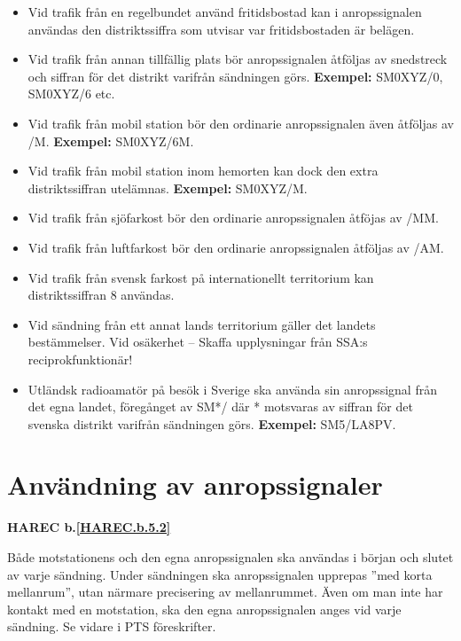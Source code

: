 \begin{itemize}

\item Vid trafik från en regelbundet använd fritidsbostad kan i
  anropssignalen användas den distriktssiffra som utvisar var
  fritidsbostaden är belägen.

\item Vid trafik från annan tillfällig plats bör anropssignalen
  åtföljas av snedstreck och siffran för det distrikt varifrån
  sändningen görs. \textbf{Exempel:} SM0XYZ/0, SM0XYZ/6 etc.

\item Vid trafik från mobil station bör den ordinarie anropssignalen
  även åtföljas av /M.  \textbf{Exempel:} SM0XYZ/6M.

\item Vid trafik från mobil station inom hemorten kan dock den extra
  distriktssiffran utelämnas.  \textbf{Exempel:} SM0XYZ/M.

\item Vid trafik från sjöfarkost bör den ordinarie anropssignalen
 åtföjas av /MM.

\item Vid trafik från luftfarkost bör den ordinarie anropssignalen
  åtföljas av /AM.

\item Vid trafik från svensk farkost på internationellt territorium
 kan distriktssiffran 8 användas.

\item Vid sändning från ett annat lands territorium gäller det landets
  bestämmelser. Vid osäkerhet -- Skaffa upplysningar från SSA:s
  reciprokfunktionär!

\item Utländsk radioamatör på besök i Sverige ska använda sin
  anropssignal från det egna landet, föregånget av SM*/ där *
  motsvaras av siffran för det svenska distrikt varifrån sändningen
  görs. \textbf{Exempel:} SM5/LA8PV.
\end{itemize}

\section{Användning av anropssignaler}
\textbf{
HAREC b.\ref{HAREC.b.5.2}\label{myHAREC.b.5.2}
}

Både motstationens och den egna anropssignalen ska användas i början
och slutet av varje sändning. Under sändningen ska anropssignalen
upprepas ''med korta mellanrum'', utan närmare precisering av
mellanrummet. Även om man inte har kontakt med en motstation, ska
den egna anropssignalen anges vid varje sändning. Se vidare i PTS
föreskrifter.

